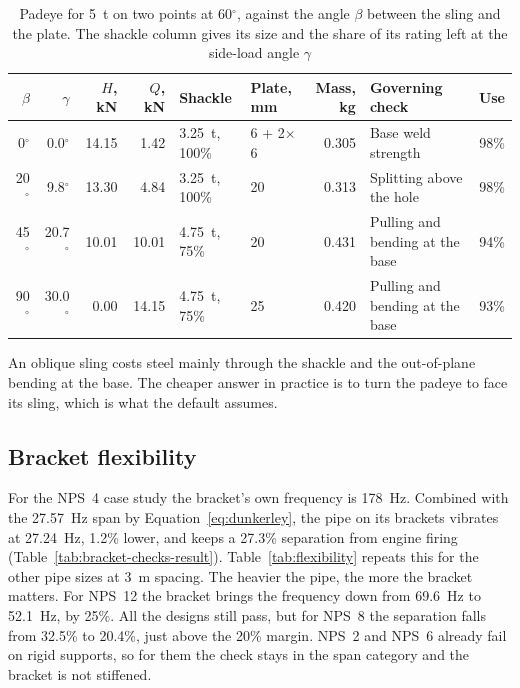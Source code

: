 \begin{table}[H]
\centering
\caption{Padeye for 5~t on two points at 60$^\circ$, against the angle $\beta$ between the sling and the plate. The shackle column gives its size and the share of its rating left at the side-load angle $\gamma$}
\label{tab:oblique}
\footnotesize
\begin{tabularx}{\textwidth}{rrrrllr>{\raggedright\arraybackslash}Xr}
\toprule
\textbf{$\beta$} & \textbf{$\gamma$} & \textbf{$H$, kN} & \textbf{$Q$, kN} & \textbf{Shackle} & \textbf{Plate, mm} & \textbf{Mass, kg} & \textbf{Governing check} & \textbf{Use}\\
\midrule
0$^\circ$ & 0.0$^\circ$ & 14.15 & 1.42 & 3.25~t, 100\% & 6 + 2$\times$6 & 0.305 & Base weld strength & 98\%\\
20$^\circ$ & 9.8$^\circ$ & 13.30 & 4.84 & 3.25~t, 100\% & 20 & 0.313 & Splitting above the hole & 98\%\\
45$^\circ$ & 20.7$^\circ$ & 10.01 & 10.01 & 4.75~t, 75\% & 20 & 0.431 & Pulling and bending at the base & 94\%\\
90$^\circ$ & 30.0$^\circ$ & 0.00 & 14.15 & 4.75~t, 75\% & 25 & 0.420 & Pulling and bending at the base & 93\%\\
\bottomrule
\end{tabularx}
\end{table}

An oblique sling costs steel mainly through the shackle and the out-of-plane
bending at the base. The cheaper answer in practice is to turn the padeye to
face its sling, which is what the default assumes.

\subsection{Bracket flexibility}

For the NPS~4 case study the bracket's own frequency is 178~Hz. Combined with
the 27.57~Hz span by Equation~\eqref{eq:dunkerley}, the pipe on its brackets
vibrates at 27.24~Hz, 1.2\% lower, and keeps a 27.3\% separation from engine
firing (Table~\ref{tab:bracket-checks-result}). Table~\ref{tab:flexibility}
repeats this for the other pipe sizes at 3~m spacing. The heavier the pipe, the
more the bracket matters. For NPS~12 the bracket brings the frequency down
from 69.6~Hz to 52.1~Hz, by 25\%. All the designs still pass, but for NPS~8
the separation falls from 32.5\% to 20.4\%, just above the 20\% margin. NPS~2
and NPS~6 already fail on rigid supports, so for them the check stays in the
span category and the bracket is not stiffened.

